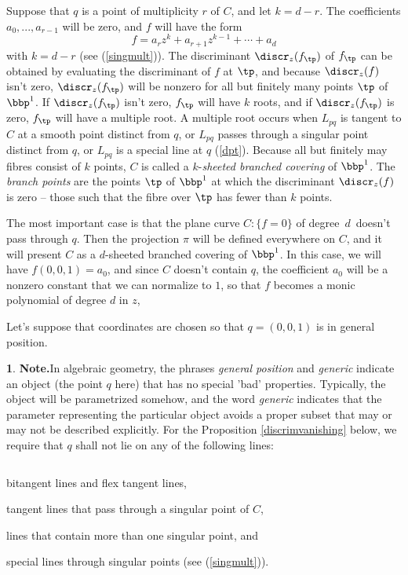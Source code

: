 \documentclass[leqno]{book}
\newcommand\Marginnote[1]{\marginnote{\hspace{-12pt}\normalfont{#1}}}
\theoremstyle{definition}%
\numberwithin{equation}{section}
\newtheorem{note}[equation]{}
\theoremstyle{theorem} %
\begin{document}
Suppose that $q$ is a point of multiplicity $r$ of $C$, and let $k =
d-r$.  The coefficients $a_0,...,a_{r-1}$ will be zero, and $f$ will have
the form 
$$f = a_rz^k + a_{r+1}z^{k-1}+\cdots +a_d$$ with $k = d-r$ (see
(\ref{singmult})).  The discriminant $\discr_z(f_{\tp})$ of $f_{\tp}$
can be obtained by evaluating the discriminant of $f$ at $\tp$, and
because $\discr_z(f)$ isn't zero, $\discr_z(f_{\tp})$ will be nonzero
for all but finitely many points $\tp$ of $\bbp^1$.  If
$\discr_z(f_{\tp})$ isn't zero, $f_{\tp}$ will have $k$ roots, and if
$\discr_z(f_{\tp})$ is zero, $f_{\tp}$ will have a multiple root.  A
multiple root occurs when $L_{pq}$ is tangent to $C$ at a smooth point
distinct from $q$, or $L_{pq}$ passes through a singular point
distinct from $q$, or $L_{pq}$ is a special line at $q$ (\ref{dpt}).
 Because all but finitely may fibres consist of $k$ points, $C$
is called a $k$-{\it sheeted branched covering} of $\bbp^1$.  The {\it
  branch points} are the points $\tp$ of $\bbp^1$ at which the
discriminant $\discr_z(f)$ is zero -- those such that the fibre over
$\tp$ has fewer than $k$ points.

\ms The most important case is that the plane curve $C :\{f=0\}$ of
degree $\,d\,$ doesn't pass through $q$.  Then the projection $\pi$
will be defined everywhere on $C$, and it will present $C$ as a
$d$-sheeted branched covering of $\bbp^1$.  In this case, we will have
$f(0,0,1) = a_0$, and since $C$ doesn't contain $q$, the coefficient
$a_0$ will be a nonzero constant that we can normalize to $1$, so that
$f$ becomes a monic polynomial of degree $d$ in $z$,


Let's suppose that coordinates are chosen so
that $q = (0,0,1)$ is in general position.

 \begin{note}{\bf Note.}\Marginnote{generic}\label{generic} In
  algebraic geometry, the phrases {\it general position} and {\it
    generic} indicate an object (the point $q$ here) that has no
  special 'bad' properties.  Typically, the object will be
  parametrized somehow, and the word {\it generic} indicates that the
  parameter representing the particular object avoids a proper subset
  that may or may not be described explicitly.  For the Proposition
  \ref{discrimvanishing} below, we require that $q$ shall not lie on
  any of the following lines:

\vspace{-0.5cm}
\label{genericcond}\Marginnote{genericcond}\begin{equation}
\end{equation}
\vspace{-0.8cm}

bitangent lines and  flex tangent lines, 

tangent lines that pass
  through a singular point of $C$, 

lines that contain more than
  one singular point, and 

special lines through singular points (see (\ref{singmult})).
\end{note}
\end{document}
